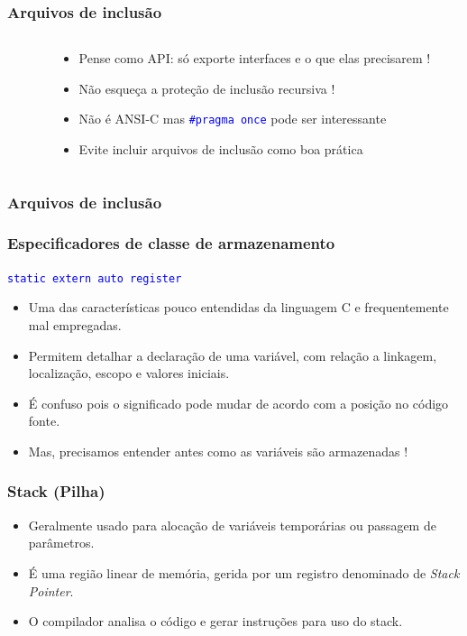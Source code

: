 \documentclass{beamer}
\begin{document}
\begin{frame}
	\frametitle{Arquivos de inclusão}
	\begin{columns}[T] %
		\begin{column}{.60\textwidth}
			
		\end{column}%
		\hfill%
		\begin{column}{.40\textwidth}
			\begin{itemize}
				\item Pense como API: só exporte interfaces e o que elas precisarem !
				\item Não esqueça a proteção de inclusão recursiva !				
				\item Não é ANSI-C mas \texttt{\textcolor{blue}{\#pragma once}} pode ser interessante
				\item Evite incluir arquivos de inclusão como boa prática
			\end{itemize}
		\end{column}%
	\end{columns}
\end{frame}

\begin{frame}
	\frametitle{Arquivos de inclusão}
	
\end{frame}

\begin{frame}
	\frametitle{Especificadores de classe de armazenamento}
	\begin{center}
		\texttt{\textcolor{blue}{static extern auto register}}
	\end{center}
	\begin{itemize}
		\vspace*{0.5cm}
	\item Uma das características pouco entendidas da linguagem C e frequentemente mal empregadas.
	\item Permitem detalhar a declaração de uma variável, com relação a linkagem, localização, escopo e valores iniciais.
	\item É confuso pois o significado pode mudar de acordo com a posição no código fonte.
	\item Mas, precisamos entender antes como as variáveis são armazenadas !
	\end{itemize}
\end{frame}

\begin{frame}
	\frametitle{Stack (Pilha)}
	\begin{itemize}
		\item Geralmente usado para alocação de variáveis temporárias ou passagem de parâmetros.
		\item É uma região linear de memória, gerida por um registro denominado de \textit{Stack Pointer}.
		\item O compilador analisa o código e gerar instruções para uso do stack.
	\end{itemize}	
\end{frame}
\end{document}
